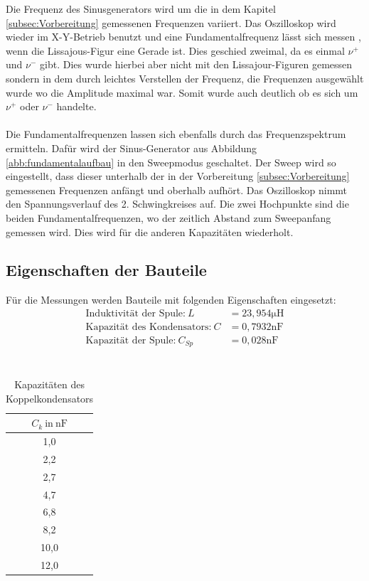 Die Frequenz des Sinusgenerators wird um
die in dem Kapitel \ref{subsec:Vorbereitung}
gemessenen Frequenzen variiert.
Das Oszilloskop wird wieder im X-Y-Betrieb benutzt
und eine Fundamentalfrequenz lässt sich messen
, wenn die Lissajous-Figur eine Gerade ist.
Dies geschied zweimal, da es einmal $\nu^+$ und
$\nu^-$ gibt. Dies wurde hierbei aber nicht mit den Lissajour-Figuren gemessen
sondern in dem durch leichtes Verstellen der Frequenz, die Frequenzen ausgewählt wurde wo die Amplitude maximal war.
Somit wurde auch deutlich ob es sich um $\nu^+ $ oder $\nu^-$ handelte.   \\
\\
Die Fundamentalfrequenzen lassen sich
ebenfalls durch das Frequenzspektrum ermitteln.
Dafür wird der Sinus-Generator
aus Abbildung \ref{abb:fundamentalaufbau}
in den Sweepmodus geschaltet.
Der Sweep wird so eingestellt, dass dieser unterhalb
der in der Vorbereitung \ref{subsec:Vorbereitung}
gemessenen Frequenzen anfängt
und oberhalb aufhört.
Das Oszilloskop nimmt den Spannungsverlauf des
2. Schwingkreises auf. Die zwei Hochpunkte sind die
beiden Fundamentalfrequenzen, wo der zeitlich
Abstand zum Sweepanfang gemessen wird.
Dies wird  für die anderen Kapazitäten wiederholt.\\

\subsection{Eigenschaften der Bauteile}
Für die Messungen werden Bauteile mit folgenden Eigenschaften eingesetzt:
\begin{align*}
\text{Induktivität der Spule:} \  L&=23,954\si{\micro\henry}\\
\text{Kapazität des Kondensators:} \  C&=0,7932\si{\nano\farad}\\
\text{Kapazität der Spule:} \ C_{Sp}&=0,028\si{\nano\farad}\\
\end{align*}\\
\begin{table}
  \centering
  \caption{Kapazitäten des Koppelkondensators}
  \label{tab:koppelkondensator}
  \begin{tabular}{c}
    \toprule
    $C_k \ \mathrm{in} \ \si{\nano\farad}$ \\
    \midrule
    1,0 \\
    2,2 \\
    2,7 \\
    4,7 \\
    6,8 \\
    8,2 \\
    10,0 \\
    12,0 \\
    \bottomrule
   \end{tabular}
\end{table}
